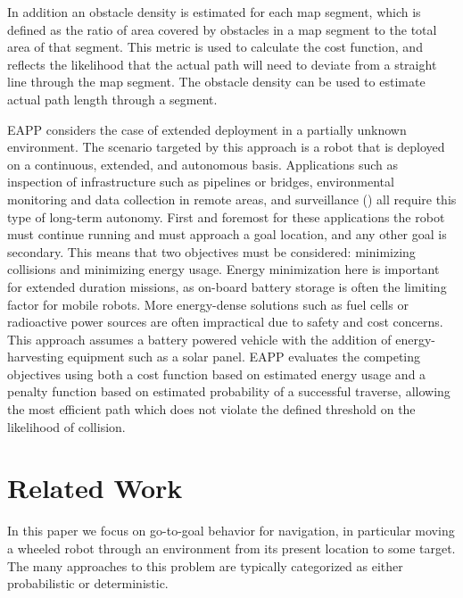 \documentclass[journal]{IEEEtran}
\begin{document}
In addition an obstacle density is estimated for each map segment, which is defined as the ratio of area covered by obstacles in a map segment to the total area of that segment. 
This metric is used to calculate the cost function, and reflects the likelihood that the actual path will need to deviate from a straight line through the map segment. 
The obstacle density can be used to estimate actual path length through a segment. 

EAPP considers the case of extended deployment in a partially unknown environment. 
The scenario targeted by this approach is a robot that is deployed on a continuous, extended, and autonomous basis. 
Applications such as inspection of infrastructure such as pipelines or bridges, environmental monitoring and data collection in remote areas, and surveillance (\cite{citations}) all require this type of long-term autonomy. 
First and foremost for these applications the robot must continue running and must approach a goal location, and any other goal is secondary. 
This means that two objectives must be considered: minimizing collisions and minimizing energy usage. 
Energy minimization here is important for extended duration missions, as on-board battery storage is often the limiting factor for mobile robots. 
More energy-dense solutions such as fuel cells or radioactive power sources are often impractical due to safety and cost concerns. 
This approach assumes a battery powered vehicle with the addition of energy-harvesting equipment such as a solar panel. 
EAPP evaluates the competing objectives using both a cost function based on estimated energy usage and a penalty function based on estimated probability of a successful traverse, allowing the most efficient path which does not violate the defined threshold on the likelihood of collision.

\section{Related Work}

In this paper we focus on go-to-goal behavior for navigation, in particular moving a wheeled robot through an environment from its present location to some target. 
The many approaches to this problem are typically categorized as either probabilistic or deterministic. 
\end{document}
